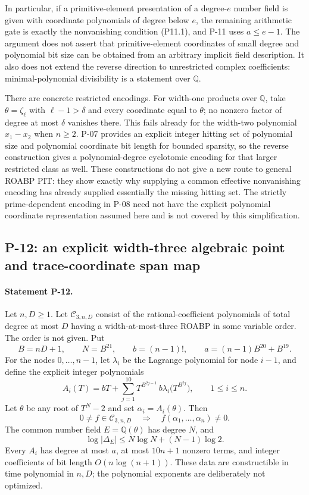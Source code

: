 \documentclass[11pt,a4paper]{article}
\theoremstyle{definition}\newtheorem{definition}{Definition}
\begin{document}
In particular, if a primitive-element presentation of a degree-$e$ number field is given with coordinate polynomials of degree below $e$, the remaining arithmetic gate is exactly the nonvanishing condition (P11.1), and P-11 uses $a\le e-1$. The argument does not assert that primitive-element coordinates of small degree and polynomial bit size can be obtained from an arbitrary implicit field description. It also does not extend the reverse direction to unrestricted complex coefficients: minimal-polynomial divisibility is a statement over $\mathbb Q$.

There are concrete restricted encodings. For width-one products over $\mathbb Q$, take $\theta=\zeta_\ell$ with $\ell-1>\delta$ and every coordinate equal to $\theta$; no nonzero factor of degree at most $\delta$ vanishes there. This fails already for the width-two polynomial $x_1-x_2$ when $n\ge2$. P-07 provides an explicit integer hitting set of polynomial size and polynomial coordinate bit length for bounded sparsity, so the reverse construction gives a polynomial-degree cyclotomic encoding for that larger restricted class as well. These constructions do not give a new route to general ROABP PIT: they show exactly why supplying a common effective nonvanishing encoding has already supplied essentially the missing hitting set. The strictly prime-dependent encoding in P-08 need not have the explicit polynomial coordinate representation assumed here and is not covered by this simplification.

\subsection{P-12: an explicit width-three algebraic point and trace-coordinate span map}
\paragraph{Statement P-12.}
Let $n,D\ge1$.  Let $\mathcal C_{3,n,D}$ consist of the rational-coefficient polynomials of total degree at most $D$ having a width-at-most-three ROABP in some variable order.  The order is not given.  Put
\[
 B=nD+1,\qquad N=B^{21},\qquad b=(n-1)!,\qquad
 a=(n-1)B^{20}+B^{19}.
\]
For the nodes $0,\ldots,n-1$, let $\lambda_i$ be the Lagrange polynomial for node $i-1$, and define the explicit integer polynomials
\[
 A_i(T)=bT+
    \sum_{j=1}^{10}T^{B^{2j-1}}\,
       b\lambda_i\bigl(T^{B^{2j}}\bigr),
       \qquad 1\le i\le n.
 \tag{P12.1}
\]
Let $\theta$ be any root of $T^N-2$ and set $\alpha_i=A_i(\theta)$.  Then
\[
 0\ne f\in\mathcal C_{3,n,D}\quad\Longrightarrow\quad
 f(\alpha_1,\ldots,\alpha_n)\ne0.
 \tag{P12.2}
\]
The common number field $E=\mathbb Q(\theta)$ has degree $N$, and
\[
 \log|\Delta_E|\le N\log N+(N-1)\log2.
 \tag{P12.3}
\]
Every $A_i$ has degree at most $a$, at most $10n+1$ nonzero terms, and integer coefficients of bit length $O(n\log(n+1))$.  These data are constructible in time polynomial in $n,D$; the polynomial exponents are deliberately not optimized.
\end{document}
